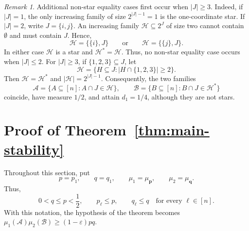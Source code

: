 \documentclass[11pt]{article}
\numberwithin{equation}{section}
\theoremstyle{definition}
\theoremstyle{remark}
\newtheorem{remark}[theorem]{Remark}
\begin{document}
\begin{remark}
Additional non-star equality cases first occur when $|J|\geq3$. Indeed, if $|J|=1$, the only increasing family of size
$2^{|J|-1}=1$ is the one-coordinate star.  If $|J|=2$, write
$J=\{i,j\}$.  An increasing family
$\mathcal{H}\subseteq2^J$ of size two cannot contain
$\emptyset$ and must contain $J$.  Hence,
\[
 \mathcal{H}
 =
 \bigl\{\{i\},J\bigr\}
 \qquad\text{or}\qquad
 \mathcal{H}
 =
 \bigl\{\{j\},J\bigr\}.
\]
In either case $\mathcal{H}$ is a star and
$\mathcal{H}^*=\mathcal{H}$.  Thus, no non-star equality case occurs
when $|J|\leq2$. For
 $|J|\geq3$, if $\{1,2,3\}\subseteq J$, let
\begin{equation*}
 \mathcal{H}
 =
 \{H\subseteq J:|H\cap\{1,2,3\}|\geq2\}.
\end{equation*}
Then $\mathcal{H}=\mathcal{H}^*$ and
$|\mathcal{H}|=2^{|J|-1}$.  Consequently, the two families
\begin{equation*}
 \mathcal{A}
 =
 \{A\subseteq[n]:A\cap J\in\mathcal{H}\},
 \qquad
 \mathcal{B}
 =
 \{B\subseteq[n]:B\cap J\in\mathcal{H}^*\}
\end{equation*}
coincide, have measure $1/2$, and attain $d_1=1/4$, although they are
not stars.
\end{remark}

































\section{Proof of Theorem~\ref{thm:main-stability}}\label{se3}

Throughout this section, put
$$
 p=p_1,\qquad q=q_1,\qquad
 \mu_1=\mu_{\mathbf p},\qquad
 \mu_2=\mu_{\mathbf q}.
$$
Thus,
$$
 0<q\leq p<\frac12,\qquad
 p_\ell\leq p,\qquad q_\ell\leq q
 \quad\text{for every }\ell\in[n].
$$
With this notation, the hypothesis of the theorem becomes
$
 \mu_1(\mathcal A)\mu_2(\mathcal B)
 \geq(1-\varepsilon)pq.
$
\end{document}

